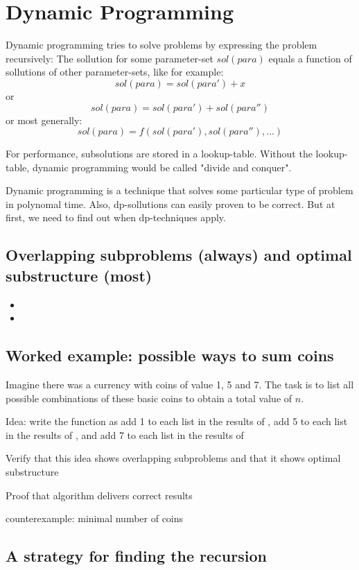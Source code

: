 \section{Dynamic Programming}

Dynamic programming tries to solve problems by expressing the problem recursively: The sollution for some parameter-set $sol(para)$ equals a function of sollutions of other parameter-sets, like for example: 
$$ sol(para) = sol(para') + x$$
or
$$ sol(para) = sol(para') + sol(para'')$$
or most generally:
$$ sol(para) = f(sol(para'), sol(para''), ...)$$

For performance, subsolutions are stored in a lookup-table. Without the lookup-table, dynamic programming would be called "divide and conquer".


Dynamic programming is a technique that solves some particular type of problem in polynomal time. Also, dp-sollutions can easily proven to be correct. But at first, we need to find out when dp-techniques apply. 

\subsection{Overlapping subproblems (always) and optimal substructure (most)}
\begin{itemize}
	\item 
	\item 
\end{itemize}

\subsection{Worked example: possible ways to sum coins}
Imagine there was a currency with coins of value 1, 5 and 7. The task is to list all possible combinations of these basic coins to obtain a total value of $n$.

Idea: 
write the function as  
add 1 to each list in the results of ,
add 5 to each list in the results of , 
and add 7 to each list in the results of 

Verify that this idea shows overlapping subproblems
and that it shows optimal substructure

Proof that algorithm delivers correct results


counterexample: minimal number of coins


\subsection{A strategy for finding the recursion}

